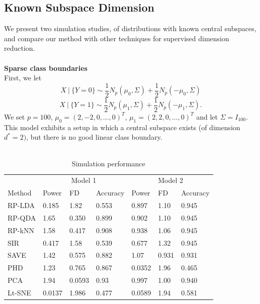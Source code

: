 \documentclass[12pt]{article}
\begin{document}
\subsection{Known Subspace Dimension}


We present two simulation studies, of distributions with known central subspaces, and compare our method with other techniques for supervised dimension reduction. \\
~\\
\textbf{Sparse class boundaries}\\
First, we let 
\[X \ | \ \{Y = 0\} \sim \frac{1}{2}N_p(\mu_0, \Sigma) + \frac{1}{2}N_p(-\mu_0, \Sigma) \]
\[X \ | \ \{ Y = 1\} \sim \frac{1}{2}N_p(\mu_1, \Sigma) + \frac{1}{2}N_p(-\mu_1, \Sigma). \]
We set $p=100$, $\mu_0 = (2, -2, 0, \ldots, 0)^T$, $\mu_1 = (2, 2, 0, \ldots, 0)^T$ and let $\Sigma = I_{100}$. This model exhibits a setup in which a central subspace exists (of dimension $d^* = 2)$, but there is no good linear class boundary. \\
~\\

\begin{table}
  \caption{Simulation performance}
  \label{sample-table}
  \centering
  \begin{tabular}{l|lll|lll}
    \toprule
    & \multicolumn{3}{c}{Model 1} & \multicolumn{3}{c}{Model 2}                     \\
    \cmidrule(r){1-7}
    Method     & Power     & FD & Accuracy &  Power     & FD & Accuracy   \\
   
    \midrule
    RP-LDA & 0.185 & 1.82  &  0.553 & 0.897 & 1.10 & 0.945 \\
    RP-QDA & 1.65  & 0.350 & 0.899 & 0.902 & 1.10 & 0.945 \\
    RP-kNN & 1.58  & 0.417 & 0.908 & 0.938 & 1.06 & 0.945 \\
    SIR & 0.417 & 1.58 & 0.539 & 0.677 & 1.32 & 0.945 \\
    SAVE & 1.42 & 0.575 & 0.882 & 1.07 & 0.931 & 0.931 \\
    PHD & 1.23 & 0.765 & 0.867 & 0.0352 & 1.96 & 0.465 \\
    PCA & 1.94 & 0.0593 & 0.93 & 0.997 & 1.00 & 0.940 \\
    Lt-SNE & 0.0137 & 1.986 & 0.477 & 0.0589 & 1.94 & 0.581 \\
    \bottomrule
  \end{tabular}
\end{table}
\end{document}
